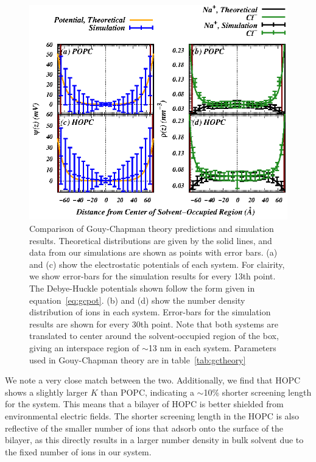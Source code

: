 \documentclass[12pt,openany,final]{book}
\newcommand{\about}{$\sim$}
\begin{document}
\begin{figure}[p]
    \caption[Comparison of Gouy-Chapman theory predictions and simulation results.]{ 
Comparison of Gouy-Chapman theory predictions and simulation results. Theoretical distributions are given by the 
solid lines, and data from our simulations are shown as points with error bars. (a) and (c) show the electrostatic
potentials of each system. For clairity, we show error-bars for the simulation
results for every 13th point. The Debye-Huckle 
potentials shown follow the form given in equation~\ref{eq:gcpot}. (b) and (d) show the number density distribution
of ions in each system. Error-bars for the 
simulation results are shown
for every 30th point. Note that both systems are
translated to center around the solvent-occupied region of the box, giving an interspace region of \about 13 nm in
each system. Parameters used in Gouy-Chapman theory are in table~\ref{tab:gctheory} }
\label{fig:gctheory}
\includegraphics[width=\textwidth]{gouy.eps}
\end{figure}
We note a very close match between the two. Additionally, we find that HOPC shows a slightly 
larger $K$ than POPC, indicating a \about10\% 
shorter screening length for the system. This means that a bilayer of HOPC is better shielded from environmental electric fields.
The shorter screening length in the HOPC is also reflective of the smaller 
number of ions that adsorb onto the surface of the bilayer, as this directly results in a larger number density in bulk solvent due to the fixed number of ions in our system.
\end{document}
